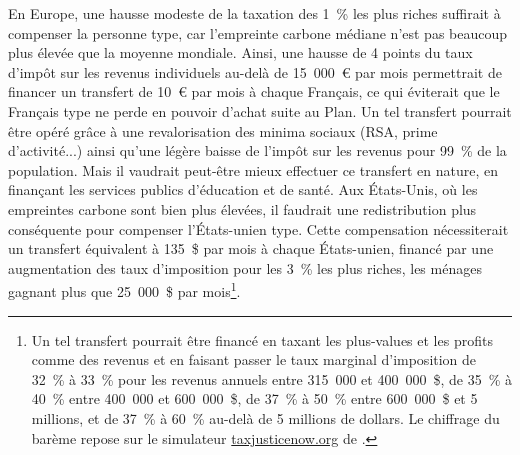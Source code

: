 \documentclass[a5paper,french,openany]{memoir}
\begin{document}
En Europe, une hausse modeste de la taxation des 1~\% les plus riches suffirait à compenser la personne type, car l'empreinte carbone médiane n'est pas beaucoup plus élevée que la moyenne mondiale. Ainsi, une hausse de 4 points du taux d'impôt sur les revenus individuels au-delà de 15~000~\euro{} par mois permettrait de financer un transfert de 10~\euro{} par mois à chaque Français, ce qui éviterait que le Français type ne perde en pouvoir d'achat suite au Plan. Un tel transfert pourrait être opéré grâce à une revalorisation des minima sociaux (RSA, prime d'activité...) ainsi qu'une légère baisse de l'impôt sur les revenus pour 99~\% de la population. Mais il vaudrait peut-être mieux effectuer ce transfert en nature, en finançant les services publics d'éducation et de santé. Aux États-Unis, où les empreintes carbone sont bien plus élevées, il faudrait une redistribution plus conséquente pour compenser l'États-unien type. Cette compensation nécessiterait un transfert équivalent à 135~\$ par mois à chaque États-unien, financé par une augmentation des taux d'imposition pour les 3~\% les plus riches, les ménages gagnant plus que 25~000~\$ par mois\footnote{Un tel transfert pourrait être financé en taxant les plus-values et les profits comme des revenus et en faisant passer le taux marginal d'imposition de 32~\% à 33~\% pour les revenus annuels entre 315~000 et 400~000~\$, de 35~\% à 40~\% entre 400~000 et 600~000~\$, de 37~\% à 50~\% entre 600~000~\$ et 5 millions, et de 37~\% à 60~\% au-delà de 5 millions de dollars. Le chiffrage du barème repose sur le simulateur \href{https://taxjusticenow.org/}{taxjusticenow.org} de \cite{saez_triumph_2019}.}.%

\end{document}
